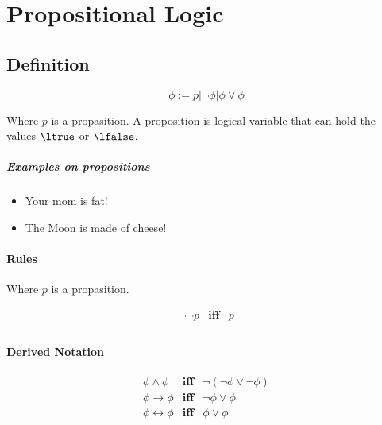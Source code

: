 \section{Propositional  Logic}

\subsection{Definition}

\begin{equation}
  \label{eq:1}
  \phi := p \vert \lnot \phi \vert \phi \lor \phi
\end{equation}

Where $p$ is a propasition. A proposition is logical variable that can hold the values $\ltrue$ or $\lfalse$.

\subparagraph{Examples on propositions}

\begin{itemize}
\item Your mom is fat!
\item The Moon is made of cheese!
\end{itemize}

\paragraph{Rules}

Where $p$ is a propasition.

\begin{equation}
  \begin{matrix}
    \lnot \lnot p & \mathbf{iff} &p \\
  \end{matrix}
\end{equation}

\paragraph{Derived Notation}

\begin{equation}
  \label{equ:notation-prop}
  \begin{matrix}
   \phi \land \phi & \mathbf{iff} & \lnot ( \lnot \phi \lor \lnot \phi ) \\
   \phi \to \phi & \mathbf{iff} & \lnot \phi \lor \phi \\ 
   \phi  \leftrightarrow \phi & \mathbf{iff}& \phi \lor \phi \\ 
  \end{matrix}
\end{equation}


